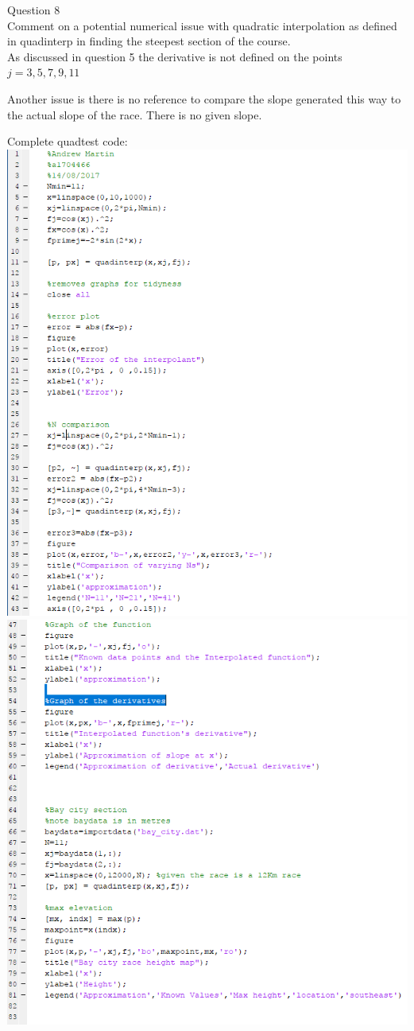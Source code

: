 \documentclass[a4paper]{article}
\begin{document}
	
	\newpage
	Question 8\\
	Comment on a potential numerical issue with quadratic interpolation as defined in quadinterp in finding the steepest section of the course.\\
	As discussed in question 5 the derivative is not defined on the points $j=3,5,7,9,11$ 
	
	Another issue is there is no reference to compare the slope generated this way to the actual slope of the race. There is no given slope.
	
	\newpage
	Complete quadtest code:\\
	\includegraphics{quadtest1.PNG}
	\includegraphics{quadtest2.PNG}
\end{document}
